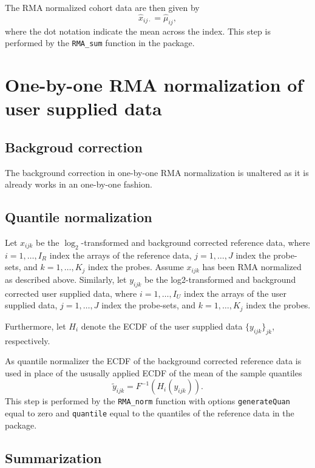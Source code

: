 The RMA normalized cohort data are then given by
\begin{equation*}
   \hat{x}_{ij\cdot} = \hat{\mu}_{ij},
\end{equation*}
where the dot notation indicate the mean across the index.
This step is performed by the \texttt{RMA\_sum} function in the \hemaClass{} package.




\section{One-by-one RMA normalization of user supplied data}
\subsection{Backgroud correction}

The background correction in one-by-one RMA normalization is unaltered as it is already works in an one-by-one fashion.


\subsection{Quantile normalization}

Let $x_{ijk}$ be the $\log_2$-transformed and background corrected reference data, where $i = 1,\dots,I_R$ index the arrays of the reference data, $j=1,\dots,J$  index the probe-sets, and $k=1,\dots,K_j$ index the probes. Assume $x_{ijk}$ has been RMA normalized as described above. Similarly,  let $y_{ijk}$ be the log2-transformed and background corrected user supplied data, where $i = 1,\dots,I_U$ index the arrays of the user supplied data, $j=1,\dots,J$  index the probe-sets, and $k=1,\dots,K_j$ index the probes.

Furthermore, let $H_i$ denote the ECDF of the user supplied data $\{y_{ijk}\}_{jk}$, respectively.

As quantile normalizer the ECDF of the background corrected reference data is used in place of the ususally applied ECDF of the mean of the sample quantiles
\begin{equation*}
   \tilde{y}_{ijk} = F^{-1}(H_i(y_{ijk})).
\end{equation*}
This step is performed by the \texttt{RMA\_norm} function with options \texttt{generateQuan} equal to zero and \texttt{quantile} equal to the quantiles of the reference data in the \hemaClass{} package.


\subsection{Summarization}

